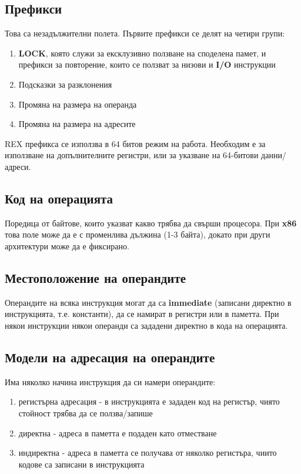 \documentclass[fleqn,12pt]{article}
\begin{document}
\subsection{Префикси}
Това са незадължителни полета. Първите префикси се делят на четири групи:
\begin{enumerate}
    \item \label{prefix:group1} \textbf{LOCK}, която служи за ексклузивно ползване на споделена памет, и префикси за повторение, които се ползват за низови и \textbf{I/O} инструкции
    \item Подсказки за разклонения
    \item Промяна на размера на операнда
    \item Промяна на размера на адресите 
\end{enumerate}

REX префикса се използва в 64 битов режим на работа. Необходим е за използване на допълнителните регистри, или за указване на 64-битови данни/адреси.

\subsection{Код на операцията}
Поредица от байтове, които указват какво трябва да свърши процесора. При \textbf{x86} това поле може да е с променлива дължина (1-3 байта), докато 
при други архитектури може да е фиксирано.

\subsection{Местоположение на операндите}
Операндите на всяка инструкция могат да са \textbf{immediate} (записани директно в инструкцията, т.е. константи), да се намират в регистри 
или в паметта. При някои инструкции някои операнди са зададени директно в кода на операцията.

\subsection{Модели на адресация на операндите}
Има няколко начина инструкция да си намери операндите:
\begin{enumerate}
    \item регистърна адресация - в инструкцията е зададен код на регистър, чиято стойност трябва да се ползва/запише
    \item директна - адреса в паметта е подаден като отместване
    \item индиректна - адреса в паметта се получава от няколко регистъра, чиито кодове са записани в инструкцията
\end{enumerate}
\end{document}
